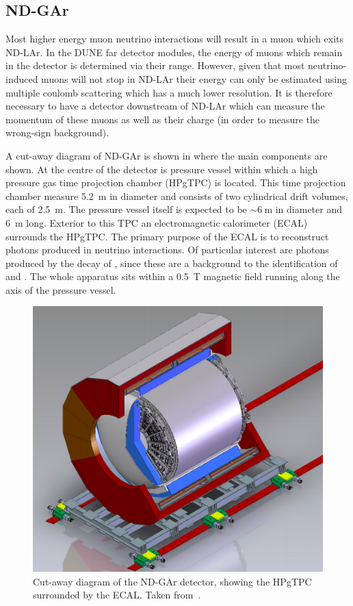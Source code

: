 \subsection{ND-GAr}
\label{sec:dune:nd:gar}

Most higher energy muon neutrino interactions will result in a muon which exits ND-LAr.
In the DUNE far detector modules, the energy of muons which remain in the detector is determined via their range.
However, given that most neutrino-induced muons will not stop in ND-LAr their energy can only be estimated using multiple coulomb scattering which has a much lower resolution.
It is therefore necessary to have a detector downstream of ND-LAr which can measure the momentum of these muons as well as their charge (in order to measure the wrong-sign background).

A cut-away diagram of ND-GAr is shown in  where the main components are shown.
At the centre of the detector is pressure vessel within which a high pressure gas time projection chamber (HPgTPC) is located.
This time projection chamber measure \SI{5.2}{\metre} in diameter and consists of two cylindrical drift volumes, each of \SI{2.5}{\metre}.
The pressure vessel itself is expected to be $\sim\SI{6}{\metre}$ in diameter and \SI{6}{\metre} long. 
Exterior to this TPC an electromagnetic calorimeter (ECAL) surrounds the HPgTPC.
The primary purpose of the ECAL is to reconstruct photons produced in neutrino interactions.
Of particular interest are photons produced by the decay of \pizero, since these are a background to the identification of \nue and \anue.
The whole apparatus sits within a \SI{0.5}{\tesla} magnetic field running along the axis of the pressure vessel.

\begin{figure}[h]
  \centering
  \includegraphics[width=.7\linewidth]{files/figures/dune_detector/ndGarDiag}
  \caption[Cut-away of the ND-GAr detector.]{Cut-away diagram of the ND-GAr detector, showing the HPgTPC surrounded by the ECAL. Taken from~\cite{ndCdr}.}
  \label{fig:ndGarDiag}
\end{figure}

